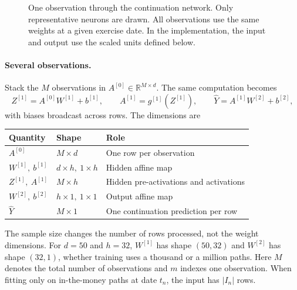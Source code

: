 \documentclass[11pt,a4paper]{article}
\newcommand{\R}{\mathbb R}
\begin{document}
\begin{figure}[ht]
\centering
{}
\caption{One observation through the continuation network. Only representative
neurons are drawn. All observations use the same weights at a given exercise date.
In the implementation, the input and output use the scaled units defined below.}
\end{figure}

\paragraph{Several observations.}
Stack the $M$ observations in $A^{[0]}\in\R^{M\times d}$. The same computation becomes
\[
 Z^{[1]}=A^{[0]}W^{[1]}+b^{[1]},\qquad
 A^{[1]}=g^{[1]}(Z^{[1]}),\qquad
 \widehat Y=A^{[1]}W^{[2]}+b^{[2]},
\]
with biases broadcast across rows. The dimensions are
\begin{center}
\begin{tabular}{lll}
\toprule
Quantity & Shape & Role\\
\midrule
$A^{[0]}$ & $M\times d$ & One row per observation\\
$W^{[1]},\ b^{[1]}$ & $d\times h,\ 1\times h$ & Hidden affine map\\
$Z^{[1]},\ A^{[1]}$ & $M\times h$ & Hidden pre-activations and activations\\
$W^{[2]},\ b^{[2]}$ & $h\times1,\ 1\times1$ & Output affine map\\
$\widehat Y$ & $M\times1$ & One continuation prediction per row\\
\bottomrule
\end{tabular}
\end{center}
The sample size changes the number of rows processed, not the weight dimensions.
For $d=50$ and $h=32$, $W^{[1]}$ has shape $(50,32)$ and $W^{[2]}$ has shape
$(32,1)$, whether training uses a thousand or a million paths. Here $M$ denotes
the total number of observations and $m$ indexes one observation. When fitting
only on in-the-money paths at date $t_n$, the input has $|I_n|$ rows.
\end{document}
